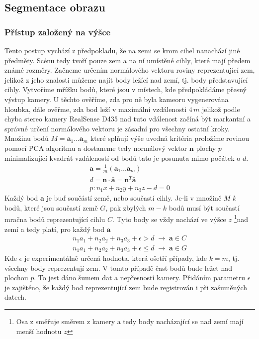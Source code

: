 \documentclass[twoside]{ctuthesis}
\newcommand{\tl}[1]{$\mathbf{#1}$}
\begin{document}
\subsection{Segmentace obrazu}
\subsubsection{Přístup založený na výšce}
\label{subsec:height}
Tento postup vychází z předpokladu, že na zemi se krom cihel nanachází jiné předměty. Scénu tedy tvoří pouze zem a na ní umístěné cihly, které mají předem známé rozměry. Začneme určením normálového vektoru roviny reprezentující zem, jelikož z jeho znalosti můžeme najít body ležící nad zemí, tj. body představující cihly. 
Vytvoříme mřížku bodů, které jsou v místech, kde předpokládáme přesný výstup kamery. U těchto ověříme, zda pro ně byla kameoru vygenerována hloubka, dále ověřme, zda bod leží v maximální vzdálenosti 4\,$m$ jelikož podle \cite{keselman2017intel}  chyba stereo kamery RealSense D435 nad tuto vdálenost začíná být markantní a správné určení normálového vektoru je zásadní pro všechny ostatní kroky. Množinu bodů $M = \mathbf{a}_1 \dotsc \mathbf{a}_m$ které splňují výše uvedná kritéria proložíme rovinou pomocí PCA algoritmu a dostaneme tedy normálový vektor \tl{n} plochy $p$ minimalizující kvadrát vzdáleností od bodů tato je posunuta mimo počátek o $d$.
\begin{align}
    \mathbf{\bar{a}} = \frac{1}{m}\left( \mathbf{a}_1 \dotsc \mathbf{a}_m \right) \\
    d = \mathbf{n} \cdot \mathbf{\bar{a}} = \mathbf{n}^T \mathbf{\bar{a}} \\
    p: n_1x + n_2y + n_3z - d = 0 \label{normal_plane}
\end{align}
Každý bod \tl{a} je buď součástí země, nebo součastí cihly. Je-li v množině $M$ $k$ bodů, které jsou součastí země $G$, pak zbylých $m - k$ bodů musí být součastí mračna bodů reprezentující cihlu $C$. Tyto body se vždy nachází ve výšce $z$ \footnote{Osa z směřuje směrem z kamery a tedy body nacházající se nad zemí mají menší hodnotu $z$}nad zemí a tedy platí, pro každý bod \tl{a}
\begin{align}
    n_1a_1 + n_2a_2 + n_3a_3 + \epsilon > d \; \rightarrow \; \mathbf{a} \in C  \\
    n_1a_1 + n_2a_2 + n_3a_3 + \epsilon \leq d \; \rightarrow \; \mathbf{a} \in G  
\end{align}
Kde $\epsilon$ je experimentálně určená hodnota, která ošetří případy, kde $k = m$, tj. všechny body reprezentují zem. V tomto případě čast bodů bude ležet nad plochou $p$. To jest dáno šumem dat a nepřesností kamery. Přidáním parametru $\epsilon$ je zajištěno, že každý bod reprezentující zem bude registrován i při zašuměných datech.
\end{document}
